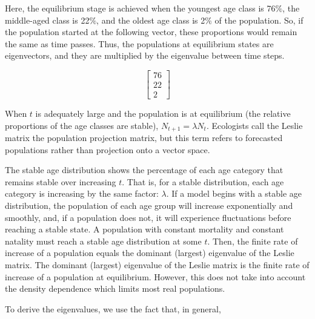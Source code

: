 \documentclass[12pt]{article}
\begin{document}
Here, the equilibrium stage is achieved when the youngest age class is 76$\%$, the middle-aged class is 22$\%$, and the oldest age class is 2$\%$ of the population. So, if the population started at the following vector, these proportions would remain the same as time passes. Thus, the populations at equilibrium states are eigenvectors, and they are multiplied by the eigenvalue between time steps.

\begin{equation*}
     \begin{bmatrix}
    76\\22\\2
    \end{bmatrix}
\end{equation*}




When $t$ is adequately large and the population is at equilibrium (the relative proportions of the age classes are stable), $N_{t+1}= \lambda N_t$. Ecologists call the Leslie matrix the population projection matrix, but this term refers to forecasted populations rather than projection onto a vector space.

The stable age distribution shows the percentage of each age category that remains stable over increasing $t$. That is, for a stable distribution, each age category is increasing by the same factor: \textbf{$\lambda$}. If a model begins with a stable age distribution, the population of each age group will increase exponentially and smoothly, and, if a population does not, it will experience fluctuations before reaching a stable state. A population with constant mortality and constant natality must reach a stable age distribution at some $t$. Then, the finite rate of increase of a population equals the dominant (largest) eigenvalue of the Leslie matrix. The dominant (largest) eigenvalue of the Leslie matrix is the finite rate of increase of a population at equilibrium. However, this does not take into account the density dependence which limits most real populations. 

To derive the eigenvalues, we use the fact that, in general,
\end{document}

